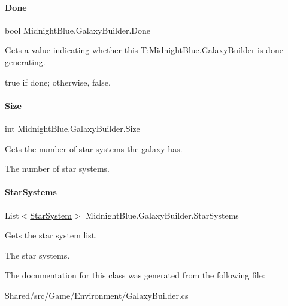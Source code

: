 \paragraph{\texorpdfstring{Done}{Done}}
{\footnotesize\ttfamily bool Midnight\+Blue.\+Galaxy\+Builder.\+Done\hspace{0.3cm}{\ttfamily [get]}}



Gets a value indicating whether this T\+:\+Midnight\+Blue.\+Galaxy\+Builder is done generating. 

{\ttfamily true} if done; otherwise, {\ttfamily false}.\hypertarget{class_midnight_blue_1_1_galaxy_builder_a295af2d47a68bdac0845f3540c815a63}{}\label{class_midnight_blue_1_1_galaxy_builder_a295af2d47a68bdac0845f3540c815a63} 
\paragraph{\texorpdfstring{Size}{Size}}
{\footnotesize\ttfamily int Midnight\+Blue.\+Galaxy\+Builder.\+Size\hspace{0.3cm}{\ttfamily [get]}}



Gets the number of star systems the galaxy has. 

The number of star systems.\hypertarget{class_midnight_blue_1_1_galaxy_builder_a85ce4bbc7de1c14ad7e7f0af3e92c1a1}{}\label{class_midnight_blue_1_1_galaxy_builder_a85ce4bbc7de1c14ad7e7f0af3e92c1a1} 
\paragraph{\texorpdfstring{Star\+Systems}{StarSystems}}
{\footnotesize\ttfamily List$<$\hyperlink{class_midnight_blue_1_1_star_system}{Star\+System}$>$ Midnight\+Blue.\+Galaxy\+Builder.\+Star\+Systems\hspace{0.3cm}{\ttfamily [get]}}



Gets the star system list. 

The star systems.

The documentation for this class was generated from the following file\+:\begin{DoxyCompactItemize}
\item 
Shared/src/\+Game/\+Environment/Galaxy\+Builder.\+cs\end{DoxyCompactItemize}
